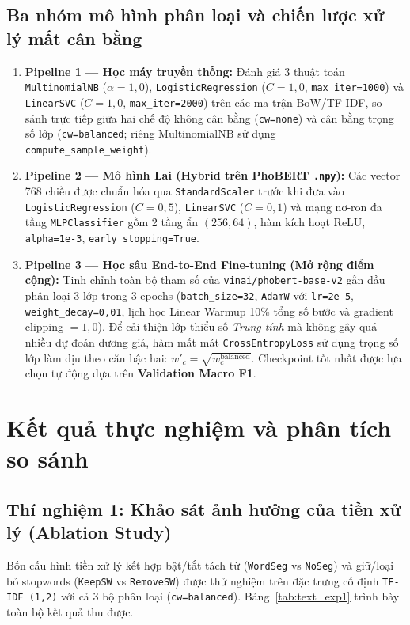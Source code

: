 \documentclass[12pt,a4paper]{article}
\begin{document}
\subsection{Ba nhóm mô hình phân loại và chiến lược xử lý mất cân bằng}
\begin{enumerate}
    \item \textbf{Pipeline 1 — Học máy truyền thống:} Đánh giá 3 thuật toán \texttt{MultinomialNB} ($\alpha=1{,}0$), \texttt{LogisticRegression} ($C=1{,}0$, \texttt{max\_iter=1000}) và \texttt{LinearSVC} ($C=1{,}0$, \texttt{max\_iter=2000}) trên các ma trận BoW/TF-IDF, so sánh trực tiếp giữa hai chế độ không cân bằng (\texttt{cw=none}) và cân bằng trọng số lớp (\texttt{cw=balanced}; riêng MultinomialNB sử dụng \texttt{compute\_sample\_weight}).
    \item \textbf{Pipeline 2 — Mô hình Lai (Hybrid trên PhoBERT \texttt{.npy}):} Các vector 768 chiều được chuẩn hóa qua \texttt{StandardScaler} trước khi đưa vào \texttt{LogisticRegression} ($C=0{,}5$), \texttt{LinearSVC} ($C=0{,}1$) và mạng nơ-ron đa tầng \texttt{MLPClassifier} gồm 2 tầng ẩn $(256, 64)$, hàm kích hoạt ReLU, \texttt{alpha=1e-3}, \texttt{early\_stopping=True}.
    \item \textbf{Pipeline 3 — Học sâu End-to-End Fine-tuning (Mở rộng điểm cộng):} Tinh chỉnh toàn bộ tham số của \texttt{vinai/phobert-base-v2} gắn đầu phân loại 3 lớp trong 3 epochs (\texttt{batch\_size=32}, \texttt{AdamW} với \texttt{lr=2e-5}, \texttt{weight\_decay=0,01}, lịch học Linear Warmup 10\% tổng số bước và gradient clipping $= 1{,}0$). Để cải thiện lớp thiểu số \textit{Trung tính} mà không gây quá nhiều dự đoán dương giả, hàm mất mát \texttt{CrossEntropyLoss} sử dụng trọng số lớp làm dịu theo căn bậc hai: $w'_c = \sqrt{w_c^{\text{balanced}}}$. Checkpoint tốt nhất được lựa chọn tự động dựa trên \textbf{Validation Macro F1}.
\end{enumerate}

\section{Kết quả thực nghiệm và phân tích so sánh}

\subsection{Thí nghiệm 1: Khảo sát ảnh hưởng của tiền xử lý (Ablation Study)}
Bốn cấu hình tiền xử lý kết hợp bật/tắt tách từ (\texttt{WordSeg} vs \texttt{NoSeg}) và giữ/loại bỏ stopwords (\texttt{KeepSW} vs \texttt{RemoveSW}) được thử nghiệm trên đặc trưng cố định \texttt{TF-IDF (1,2)} với cả 3 bộ phân loại (\texttt{cw=balanced}). Bảng~\ref{tab:text_exp1} trình bày toàn bộ kết quả thu được.
\end{document}
